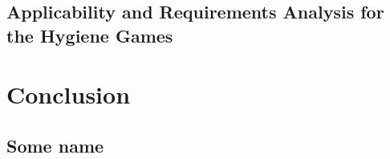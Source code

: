	\section{Applicability and Requirements Analysis for the Hygiene Games}

\chapter{Conclusion}

\clearpage
\renewcommand{\bibname}{References} %
\printbibliography[heading=bibintoc] %

\begin{appendices}
	\chapter{Some name}
	\lipsum[3]
\end{appendices}

